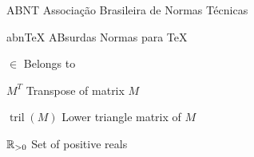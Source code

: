 \begin{siglas}
    \item[ABNT] Associação Brasileira de Normas Técnicas
    \item[abnTeX] ABsurdas Normas para TeX
  \end{siglas}
  
  \begin{simbolos}
    \item[$\in$] Belongs to 
    \item[$M^T$] Transpose of matrix $M$
    \item[$\operatorname{tril}(M)$] Lower triangle matrix of $M$
    \item[$\mathbb{R}_{>0}$] Set of positive reals
  \end{simbolos}